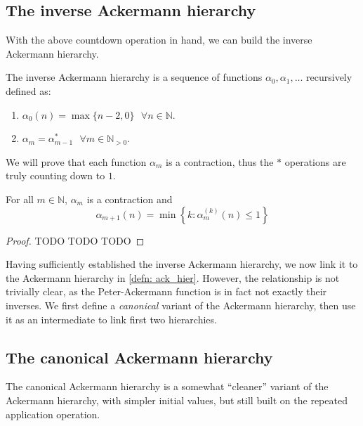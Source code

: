 \subsection{The inverse Ackermann hierarchy}

With the above countdown operation in hand, we can 
build the inverse Ackermann hierarchy.

\begin{defn} \label{defn: inv_ack_hier}
The inverse Ackermann hierarchy is a sequence of 
functions $\alpha_0, \alpha_1, \ldots $ recursively defined as:
\begin{enumerate}
	\item $\alpha_0(n) = \max\{n-2, 0\} \ \ \ \forall n \in \mathbb{N}$.
	\item $\alpha_m = \alpha_{m-1}^*  \ \ \ \forall m\in \mathbb{N}_{>0}$.
\end{enumerate}
\end{defn}

We will prove that each function $\alpha_m$ is a contraction, 
thus the $*$ operations are truly counting down to $1$.

\begin{thm} \label{thm: inv_ack_countdown}
For all $m\in\mathbb{N}$, $\alpha_m$ is a contraction and
\begin{equation}
\alpha_{m+1}(n) = \min\left\{ k : \alpha_m^{(k)}(n) \le 1 \right\}
\end{equation}
\end{thm}

\begin{proof}
TODO TODO TODO
\end{proof}

Having sufficiently established the inverse Ackermann 
hierarchy, we now link it to the Ackermann hierarchy 
in \cref{defn: ack_hier}. However, the relationship is 
not trivially clear, as the Peter-Ackermann function is 
in fact not exactly {\color{magenta}their inverses.} 
We first define a \textit{canonical} variant of the 
Ackermann hierarchy, then use it as an intermediate to 
link first two hierarchies.

\subsection{The canonical Ackermann hierarchy}

The canonical Ackermann hierarchy is a somewhat ``cleaner'' 
variant of the Ackermann hierarchy, with simpler initial 
values, but still built on the repeated application operation.

